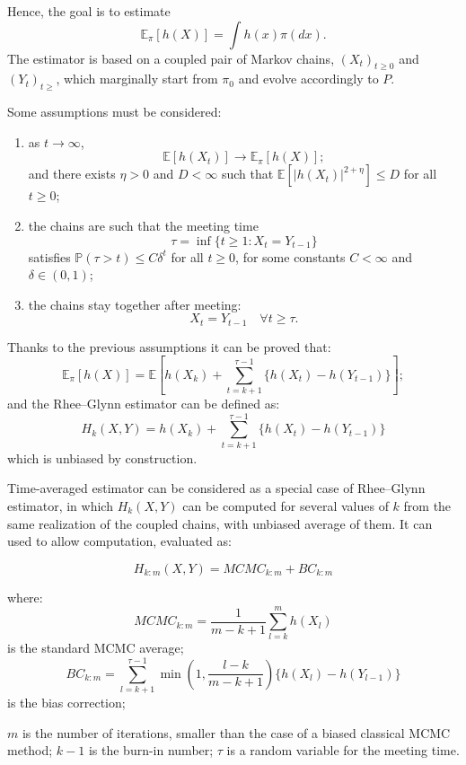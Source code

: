 \documentclass[11pt,a4paper,oneside]{report}
\begin{document}
Hence, the goal is to estimate
$$
\mathbb{E}_{\pi}[h(X)] 
= \int h(x) \pi (d x)
.
$$
The estimator is based on a coupled pair of Markov chains, $(X_t)_{t\geq 0}$ and $(Y_t)_{t\geq}$, which marginally start from $\pi_0$ and evolve accordingly to $P$.



Some assumptions must be considered:
\begin{enumerate}
	\item as $t \to \infty$, 
	$$ \mathbb E [h(X_t)] \to \mathbb E_\pi [h(X)];$$
	and there exists $\eta > 0$ and $D < \infty$ such that $\mathbb E [|h(X_t)|^{2 + \eta}] \leq D$ for all $t \geq 0$;
	
	
	\item the chains are such that the meeting time 
	$$
	\tau 
	= \inf\{t \geq 1 : X_t = Y_{t-1}\}
	$$ 
	satisfies $\mathbb{P}(\tau > t) \leq C \delta^t$ for all $t \geq 0$, for some constants $C < \infty$ and $\delta \in (0,1)$;
	
	
	\item the chains stay together after meeting:
	$$X_t = Y_{t-1} \quad  \forall t \geq \tau.$$
\end{enumerate}

Thanks to the previous assumptions it can be proved that:
$$\mathbb{E}_{\pi}[h(X)] = \mathbb{E}[
h(X_k) + \sum_{t = k+1}^{\tau -1}\{h(X_t) - h(Y_{t-1})\} ]
;$$
and  the Rhee--Glynn estimator can be defined as:
$$ 
H_k(X,Y)
= h(X_k) + \sum_{t = k+1}^{\tau -1}\{h(X_t) - h(Y_{t-1})\} 
$$
which is unbiased by construction.




Time-averaged estimator can be considered as a special case of Rhee--Glynn estimator, in which $H_k(X,Y)$ can be computed for several values of $k$ from the same realization of the coupled chains, with unbiased average of them. It can used to allow computation, evaluated as:

$$
H_{k:m}(X,Y) = MCMC_{k:m} + BC_{k:m}
$$

where:
$$MCMC_{k:m}=\frac{1}{m-k+1}\sum_{l=k}^{m}h(X_l)$$  is the standard MCMC average;
 \small{$$BC_{k:m}=\sum_{l=k+1}^{\tau -1}\min(1, \frac{l-k}{m-k+1})\{h(X_l)-h(Y_{l-1})\} $$} is the bias correction;
 
 $m$ is the number of iterations, smaller than the case of a biased classical MCMC method; $k-1$ is the burn-in number; $\tau$ is a random variable for the meeting time.
\end{document}
